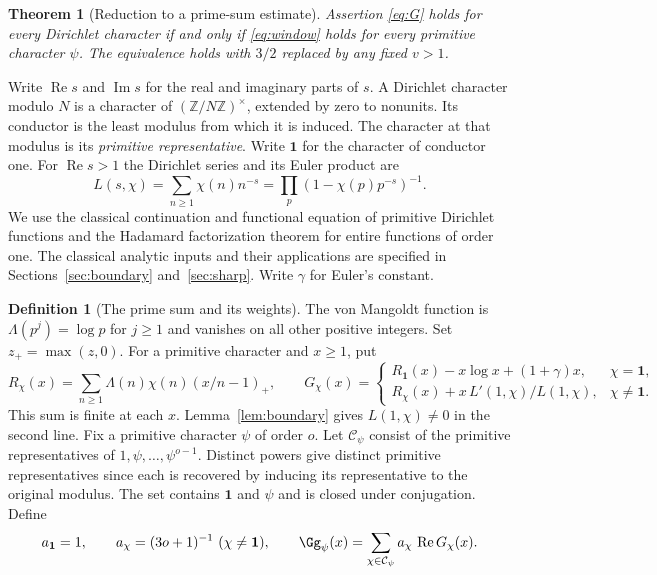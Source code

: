 \documentclass[a4paper,11pt]{article}
\newtheorem{theorem}[proposition]{Theorem}
\theoremstyle{definition}
\newtheorem{definition}[proposition]{Definition}
\theoremstyle{remark}
\newcommand{\ZZ}{\mathbb Z}\newcommand{\ord}{\operatorname{ord}}
\newcommand{\real}{\operatorname{Re}}\newcommand{\imag}{\operatorname{Im}}
\numberwithin{equation}{section}
\begin{document}
\begin{theorem}[Reduction to a prime-sum estimate]\leavevmode\label{thm:criterion16}
Assertion \eqref{eq:G} holds for every Dirichlet character if and only if \eqref{eq:window} holds for every primitive character \(\psi\). The equivalence holds with \(3/2\) replaced by any fixed \(v>1\).
\end{theorem}

Write \(\real s\) and \(\imag s\) for the real and imaginary parts of \(s\). A Dirichlet character modulo \(N\) is a character of \((\ZZ/N\ZZ)^\times\), extended by zero to nonunits. Its conductor is the least modulus from which it is induced. The character at that modulus is its \emph{primitive representative}. Write \(\mathbf1\) for the character of conductor one. For \(\real s>1\) the Dirichlet series and its Euler product are
\[
 L(s,\chi)=\sum_{n\ge1}\chi(n)n^{-s}
            =\prod_p(1-\chi(p)p^{-s})^{-1}.
\]
We use the classical continuation and functional equation of primitive Dirichlet functions and the Hadamard factorization theorem for entire functions of order one. The classical analytic inputs and their applications are specified in Sections~\ref{sec:boundary} and~\ref{sec:sharp}. Write \(\gamma\) for Euler's constant.

\begin{definition}[The prime sum and its weights]\label{def:ramp}\label{def:family}
The von Mangoldt function is \(\Lambda(p^j)=\log p\) for \(j\ge1\) and vanishes on all other positive integers. Set \(z_+=\max(z,0)\). For a primitive character and \(x\ge1\), put
\begin{equation}
 R_\chi(x)=\sum_{n\ge1}\Lambda(n)\chi(n)(x/n-1)_+,\qquad
 G_\chi(x)=
 \begin{cases}
 R_{\mathbf1}(x)-x\log x+(1+\gamma)x,&\chi=\mathbf1,\\
 R_\chi(x)+x\,L'(1,\chi)/L(1,\chi),&\chi\ne\mathbf1 .
 \end{cases}                                                    \label{eq:Gchi}
\end{equation}
This sum is finite at each \(x\). Lemma~\ref{lem:boundary} gives \(L(1,\chi)\ne0\) in the second line. Fix a primitive character \(\psi\) of order \(o\). Let \(\mathcal C_\psi\) consist of the primitive representatives of \(1,\psi,\ldots,\psi^{o-1}\). Distinct powers give distinct primitive representatives since each is recovered by inducing its representative to the original modulus. The set contains \(\mathbf1\) and \(\psi\) and is closed under conjugation. Define
\[
 a_{\mathbf1}=1,\qquad a_\chi=(3o+1)^{-1}\ (\chi\ne\mathbf1),
 \qquad \Gg_\psi(x)=\sum_{\chi\in\mathcal C_\psi}a_\chi\,\real G_\chi(x).
\]
\end{definition}
\end{document}
